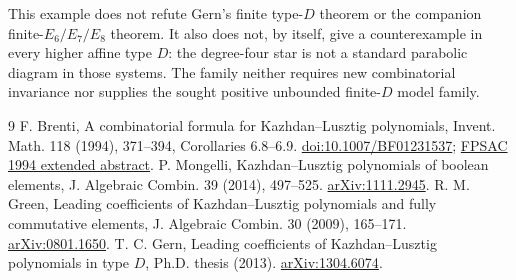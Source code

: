 \documentclass[11pt]{article}
\begin{document}
This example does not refute Gern's finite type-$D$ theorem
\cite[Theorem 4.5.11]{Gern} or the companion finite-$E_6/E_7/E_8$ theorem.
It also does not, by itself, give a counterexample in every higher affine
type $D$: the degree-four star is not a standard parabolic diagram in
those systems. The family neither requires new combinatorial invariance
nor supplies the sought positive unbounded finite-$D$ model family.

\begin{thebibliography}{9}
 F. Brenti, A combinatorial formula for Kazhdan--Lusztig
polynomials, Invent. Math. 118 (1994), 371--394, Corollaries 6.8--6.9.
\href{https://doi.org/10.1007/BF01231537}{doi:10.1007/BF01231537}; \href{https://fpsac-archive.github.io/FPSAC94/ARTICLES/06Brenti.pdf}{FPSAC 1994 extended abstract}.
 P. Mongelli, Kazhdan--Lusztig polynomials of boolean
elements, J. Algebraic Combin. 39 (2014), 497--525.
\href{https://arxiv.org/abs/1111.2945}{arXiv:1111.2945}.
 R. M. Green, Leading coefficients of Kazhdan--Lusztig
polynomials and fully commutative elements, J. Algebraic Combin. 30 (2009),
165--171. \href{https://arxiv.org/abs/0801.1650}{arXiv:0801.1650}.
 T. C. Gern, Leading coefficients of Kazhdan--Lusztig
polynomials in type $D$, Ph.D. thesis (2013).
\href{https://arxiv.org/abs/1304.6074}{arXiv:1304.6074}.
\end{thebibliography}
\end{document}
